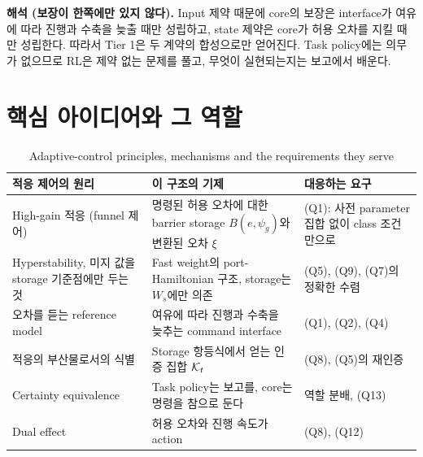 \documentclass[11pt]{article}\usepackage[margin=1in]{geometry}\usepackage{amsmath,amssymb,amsthm,mathtools}\usepackage{graphicx}\graphicspath{{figures/}{../figures/}{figs/}{./}}\usepackage{enumitem}\usepackage{hyperref}\usepackage{cleveref}\usepackage{tikz}\usetikzlibrary{arrows.meta,positioning,calc,shapes.geometric}\usepackage{float}\usepackage{rotating}\usepackage[most]{tcolorbox}\usepackage{kotex}\usepackage{booktabs}\emergencystretch=1.6em\tolerance=2000 \crefname{assumption}{Assumption}{Assumptions}\Crefname{assumption}{Assumption}{Assumptions}\crefname{definition}{Definition}{Definitions}\Crefname{definition}{Definition}{Definitions}\crefname{proposition}{Proposition}{Propositions}\Crefname{proposition}{Proposition}{Propositions}\crefname{fact}{Fact}{Facts}\Crefname{fact}{Fact}{Facts} \newtheorem{assumption}{Assumption}\newtheorem{definition}{Definition}\newtheorem{lemma}{Lemma}\newtheorem{proposition}{Proposition}\newtheorem{theorem}{Theorem}\newtheorem{corollary}{Corollary}\newtheorem{fact}{Fact}\theoremstyle{remark}\newtheorem{remark}{Remark} \newcommand{\R}{\mathbb{R}}\newcommand{\xb}{\bar x}\newcommand{\Ab}{\bar A}\newcommand{\By}{\bar B_y}\newcommand{\U}{\mathcal U}\newcommand{\Z}{\mathcal Z}
\begin{document}
\textbf{해석 (보장이 한쪽에만 있지 않다).} Input 제약 때문에 core의 보장은 interface가 여유에 따라 진행과 수축을 늦출 때만 성립하고, state 제약은 core가 허용 오차를 지킬 때만 성립한다. 따라서 Tier 1은 두 계약의 합성으로만 얻어진다. Task policy에는 의무가 없으므로 RL은 제약 없는 문제를 풀고, 무엇이 실현되는지는 보고에서 배운다.

\section{핵심 아이디어와 그 역할}
\label{sec:ideas}

\begin{table}[H]
\centering\footnotesize\setlength{\tabcolsep}{4pt}
\caption{Adaptive-control principles, mechanisms and the requirements they serve}
\label{tab:ideas}
\begin{tabular}{p{3.6cm}p{6.2cm}p{4.6cm}}
\toprule
적응 제어의 원리 & 이 구조의 기제 & 대응하는 요구 \\
\midrule
High-gain 적응 (funnel 제어) & 명령된 허용 오차에 대한 barrier storage $B(e,\psi_g)$와 변환된 오차 $\xi$ & (Q1): 사전 parameter 집합 없이 class 조건만으로 \\
Hyperstability, 미지 값을 storage 기준점에만 두는 것 & Fast weight의 port-Hamiltonian 구조, storage는 $W_s$에만 의존 & (Q5), (Q9), (Q7)의 정확한 수렴 \\
오차를 듣는 reference model & 여유에 따라 진행과 수축을 늦추는 command interface & (Q1), (Q2), (Q4) \\
적응의 부산물로서의 식별 & Storage 항등식에서 얻는 인증 집합 $\mathcal K_t$ & (Q8), (Q5)의 재인증 \\
Certainty equivalence & Task policy는 보고를, core는 명령을 참으로 둔다 & 역할 분배, (Q13) \\
Dual effect & 허용 오차와 진행 속도가 action & (Q8), (Q12) \\
\bottomrule
\end{tabular}
\end{table}
\end{document}
